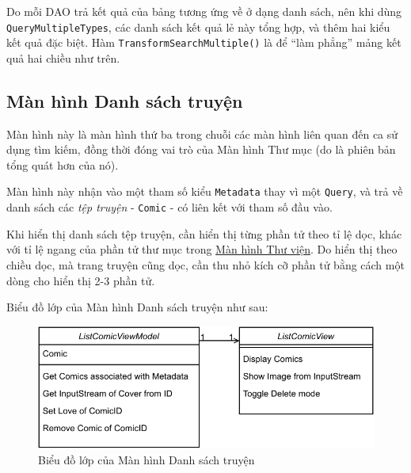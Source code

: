 \documentclass[../../../../thesis]{subfiles}
\begin{document}
Do mỗi DAO trả kết quả của bảng tương ứng về ở dạng danh sách, nên khi dùng
\texttt{QueryMultipleTypes}, các danh sách kết quả lẻ này tổng hợp, và thêm hai
kiểu kết quả đặc biệt. Hàm \texttt{TransformSearchMultiple()} là để ``làm
phẳng'' mảng kết quả hai chiều như trên.



\subsection{Màn hình Danh sách truyện}\label{sec:list-comic-design}

Màn hình này là màn hình thứ ba trong chuỗi các màn hình liên quan đến ca sử
dụng tìm kiếm, đồng thời đóng vai trò của Màn hình Thư mục (do là phiên bản tổng
quát hơn của nó).

Màn hình này nhận vào một tham số kiểu \texttt{Metadata} thay vì một
\texttt{Query}, và trả về danh sách các \emph{tệp truyện} - \texttt{Comic} - có
liên kết với tham số đầu vào.

Khi hiển thị danh sách tệp truyện, cần hiển thị từng phần tử theo tỉ lệ dọc,
khác với tỉ lệ ngang của phần tử thư mục trong \hyperref[sec:library-design]{Màn
hình Thư viện}. Do hiển thị theo chiều dọc, mà trang truyện cũng dọc, cần thu
nhỏ kích cỡ phần tử bằng cách một dòng cho hiển thị 2-3 phần tử.

Biểu đồ lớp của Màn hình Danh sách truyện như sau:

\begin{figure}[H]
    \centering
    \includegraphics[scale=0.85]{../images/list_comics_mvvm_class.pdf}
    \caption{Biểu đồ lớp của Màn hình Danh sách truyện}
    \label{fig:list_comics_mvvm_class}
\end{figure}
\end{document}
